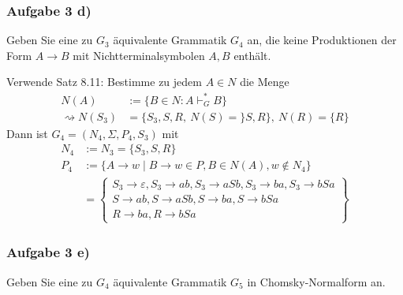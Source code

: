 \subsubsection{Aufgabe 3 d)}
Geben Sie eine zu $G_3$ äquivalente Grammatik $G_4$ an, die keine Produktionen der Form $A\to B$ mit Nichtterminalsymbolen $A,B$ enthält.

\begin{lösung}
	Verwende Satz 8.11:
	Bestimme zu jedem $A\in N$ die Menge 
	\begin{align*}
		N(A)&:=\big\lbrace B\in N:A\vdash_G^\ast B\big\rbrace\\
		\rightsquigarrow N(S_3)&=\lbrace S_3,S,R,~N(S)=\rbrace S,R\rbrace,~N(R)=\lbrace R\rbrace
	\end{align*}
	Dann ist $G_4=(N_4,\Sigma,P_4,S_3)$ mit
	\begin{align*}
		N_4&:=N_3=\lbrace S_3,S,R\rbrace\\
		P_4&:=\big\lbrace A\to w\mid B\to w\in P,B\in N(A),w\not\in N_4\big\rbrace\\
		&=\left\lbrace\begin{array}{l}
				S_3\to\varepsilon, S_3\to ab,S_3\to aSb,S_3\to ba,S_3\to bSa\\
			S\to ab, S\to aSb,S\to ba, S\to bSa\\
			R\to ba, R\to bSa
		\end{array}\right\rbrace
	\end{align*}
\end{lösung}

\subsubsection{Aufgabe 3 e)}
Geben Sie eine zu $G_4$ äquivalente Grammatik $G_5$ in Chomsky-Normalform an.

